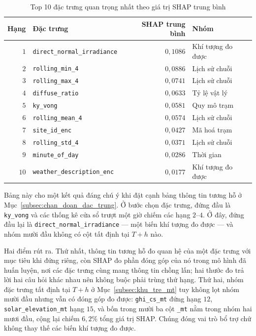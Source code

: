 \documentclass[12pt, a4paper]{report}
\begin{document}
\begin{table}[htbp]
\centering
\caption{Top 10 đặc trưng quan trọng nhất theo giá trị SHAP trung bình}
\label{tab:shap_global}
\small
\begin{tabular}{r l r l}
\toprule
\textbf{Hạng} & \textbf{Đặc trưng} & \textbf{SHAP trung bình} & \textbf{Nhóm} \\
\midrule
$1$  & \texttt{direct\_normal\_irradiance} & $0{,}1086$ & Khí tượng đo được \\
$2$  & \texttt{rolling\_min\_4}            & $0{,}0886$ & Lịch sử chuỗi \\
$3$  & \texttt{rolling\_max\_4}            & $0{,}0741$ & Lịch sử chuỗi \\
$4$  & \texttt{diffuse\_ratio}             & $0{,}0633$ & Tỷ lệ vật lý \\
$5$  & \texttt{ky\_vong}                  & $0{,}0581$ & Quy mô trạm \\
$6$  & \texttt{rolling\_mean\_4}           & $0{,}0574$ & Lịch sử chuỗi \\
$7$  & \texttt{site\_id\_enc}              & $0{,}0427$ & Mã hoá trạm \\
$8$  & \texttt{rolling\_std\_4}            & $0{,}0371$ & Lịch sử chuỗi \\
$9$  & \texttt{minute\_of\_day}            & $0{,}0286$ & Thời gian \\
$10$ & \texttt{weather\_description\_enc}  & $0{,}0177$ & Khí tượng đo được \\
\bottomrule
\end{tabular}


\end{table}

Bảng này cho một kết quả đáng chú ý khi đặt cạnh bảng thông tin tương hỗ ở Mục~\ref{subsec:chan_doan_dac_trung}. Ở bước
chọn đặc trưng, đứng đầu là \texttt{ky\_vong} và các thống kê cửa sổ trượt một giờ chiếm các
hạng $2$--$4$. Ở đây, đứng đầu lại là
\texttt{direct\_normal\_irradiance} --- một biến khí tượng đo được --- và nhóm mười đầu không có
cột tất định tại $T{+}h$ nào.

Hai điểm rút ra. Thứ nhất, thông tin tương hỗ đo quan hệ của một đặc trưng với mục tiêu khi
đứng riêng, còn SHAP đo phần đóng góp của nó trong mô hình đã huấn luyện, nơi các đặc
trưng cùng mang thông tin chồng lấn; hai thước đo trả lời hai câu hỏi khác nhau nên không buộc phải trùng
thứ hạng. Thứ hai, nhóm đặc trưng tất định tại $T{+}h$ ở Mục~\ref{subsec:khu_tre_mt} tuy không
lọt nhóm mười đầu nhưng vẫn có đóng góp đo được: \texttt{ghi\_cs\_mt} đứng hạng $12$,
\texttt{solar\_elevation\_mt} hạng $15$, và bốn trong mười ba cột \texttt{\_mt} nằm trong nhóm hai
mươi đầu, cộng lại chiếm $6{,}2\%$ tổng giá trị SHAP. Chúng đóng vai trò bổ trợ chứ không thay thế
các biến khí tượng đo được.
\end{document}
